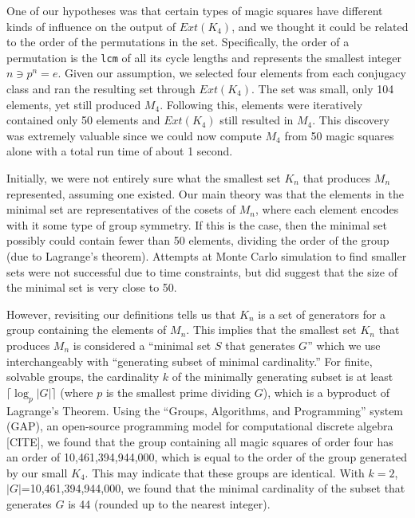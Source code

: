\documentclass[12pt]{report}
\begin{document}
\par One of our hypotheses was that certain types of magic squares have different kinds of
influence on the output of $Ext\left(K_4\right)$, and we thought it could be related to the order
of the permutations in the set. Specifically, the order of a permutation is the \texttt{lcm} of all
its cycle lengths and represents the smallest integer $n \ni p^n = e$. Given our assumption, we
selected four elements from each conjugacy class and ran the resulting set through
$Ext\left(K_4\right)$. The set was small, only 104 elements, yet still produced $M_4$. Following
this, elements were iteratively contained only 50 elements and $Ext\left(K_4\right)$ still resulted
in $M_4$. This discovery was extremely valuable since we could now compute $M_4$ from 50 magic
squares alone with a total run time of about 1 second.

\par Initially, we were not entirely sure what the smallest set $K_n$ that produces $M_n$
represented,
assuming one existed. Our main theory was that the elements in the minimal set are representatives
of the cosets of $M_n$, where each element encodes with it some type of group symmetry. If this is
the
case, then the minimal set possibly could contain fewer than 50 elements, dividing the order of the
group (due to Lagrange's theorem). Attempts at Monte Carlo simulation to find smaller sets were not
successful due to time constraints, but did suggest that the size of the minimal set is very close
to 50.

\par However, revisiting our definitions tells us that $K_n$ is a set of generators for a group
containing the elements of $M_n$. This implies that the smallest set $K_n$ that produces $M_n$ is
considered a ``minimal set $S$ that generates $G$'' which we  use interchangeably with ``generating
subset of minimal cardinality.'' For finite, solvable groups, the cardinality $k$ of the minimally
generating subset is at least $\lceil\log_{p}{\left|G\right|}\rceil$ (where $p$ is the smallest
prime dividing $G$), which is a byproduct of Lagrange's Theorem. Using the ``Groups, Algorithms,
and Programming'' system (GAP), an open-source programming model for computational discrete algebra
  [CITE], we found that the group containing all magic squares of order four has an order of
10,461,394,944,000, which is equal to the order of the group generated by our small $K_4$. This may
indicate that these groups are identical. With $k=2$, $\left|G\right|$=10,461,394,944,000, we found
that the minimal cardinality of the subset that generates $G$ is 44 (rounded up to the nearest
integer).
\end{document}
